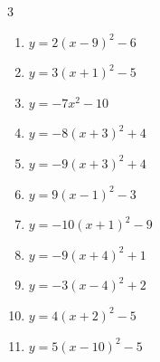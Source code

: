 \begin{multicols}{3}
\begin{enumerate}
        \phantom{$\displaystyle 頂点\left( -5 , -5 \right)$}

  \item $\displaystyle y=2\left( x-9\right)^{2}-6$

        \phantom{$\displaystyle 頂点\left( 9 , -6 \right)$}

  \item $\displaystyle y=3\left( x+1\right)^{2}-5$

        \phantom{$\displaystyle 頂点\left( -1 , -5 \right)$}

  \item $\displaystyle y=-7x^{2}-10$

        \phantom{$\displaystyle 頂点\left( 0 , -10 \right)$}

\columnbreak %

\resetques

  \item $\displaystyle y=-8\left( x+3\right)^{2}+4$

        \phantom{$\displaystyle 頂点\left( -3 , 4 \right)$}

  \item $\displaystyle y=-9\left( x+3\right)^{2}+4$

        \phantom{$\displaystyle 頂点\left( -3 , 4 \right)$}

  \item $\displaystyle y=9\left( x-1\right)^{2}-3$

        \phantom{$\displaystyle 頂点\left( 1 , -3 \right)$}

  \item $\displaystyle y=-10\left( x+1\right)^{2}-9$

        \phantom{$\displaystyle 頂点\left( -1 , -9 \right)$}

  \item $\displaystyle y=-9\left( x+4\right)^{2}+1$

        \phantom{$\displaystyle 頂点\left( -4 , 1 \right)$}

  \item $\displaystyle y=-3\left( x-4\right)^{2}+2$

        \phantom{$\displaystyle 頂点\left( 4 , 2 \right)$}

  \item $\displaystyle y=4\left( x+2\right)^{2}-5$

        \phantom{$\displaystyle 頂点\left( -2 , -5 \right)$}

  \item $\displaystyle y=5\left( x-10\right)^{2}-5$


\end{enumerate}
\end{multicols}
